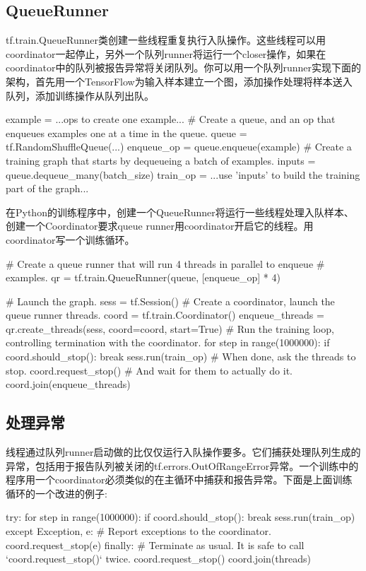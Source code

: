 \subsection{QueueRunner}
tf.train.QueueRunner类创建一些线程重复执行入队操作。这些线程可以用coordinator一起停止，另外一个队列runner将运行一个closer操作，如果在coordinator中的队列被报告异常将关闭队列。你可以用一个队列runner实现下面的架构，首先用一个TensorFlow为输入样本建立一个图，添加操作处理将样本送入队列，添加训练操作从队列出队。
\begin{python}
example = ...ops to create one example...
# Create a queue, and an op that enqueues examples one at a time in the queue.
queue = tf.RandomShuffleQueue(...)
enqueue_op = queue.enqueue(example)
# Create a training graph that starts by dequeueing a batch of examples.
inputs = queue.dequeue_many(batch_size)
train_op = ...use 'inputs' to build the training part of the graph...	
\end{python}
在Python的训练程序中，创建一个QueueRunner将运行一些线程处理入队样本、创建一个Coordinator要求queue runner用coordinator开启它的线程。用coordinator写一个训练循环。
\begin{python}
# Create a queue runner that will run 4 threads in parallel to enqueue
# examples.
qr = tf.train.QueueRunner(queue, [enqueue_op] * 4)

# Launch the graph.
sess = tf.Session()
# Create a coordinator, launch the queue runner threads.
coord = tf.train.Coordinator()
enqueue_threads = qr.create_threads(sess, coord=coord, start=True)
# Run the training loop, controlling termination with the coordinator.
for step in range(1000000):
    if coord.should_stop():
        break
    sess.run(train_op)
# When done, ask the threads to stop.
coord.request_stop()
# And wait for them to actually do it.
coord.join(enqueue_threads)
\end{python}
\subsection{处理异常}
线程通过队列runner启动做的比仅仅运行入队操作要多。它们捕获处理队列生成的异常，包括用于报告队列被关闭的tf.errors.OutOfRangeError异常。一个训练中的程序用一个coordinator必须类似的在主循环中捕获和报告异常。下面是上面训练循环的一个改进的例子:
\begin{python}
try:
    for step in range(1000000):
      if coord.should_stop():
        break
      sess.run(train_op)
except Exception, e:
    # Report exceptions to the coordinator.
    coord.request_stop(e)
finally:
    # Terminate as usual. It is safe to call `coord.request\_stop()` twice.
    coord.request_stop()
    coord.join(threads)
\end{python}
